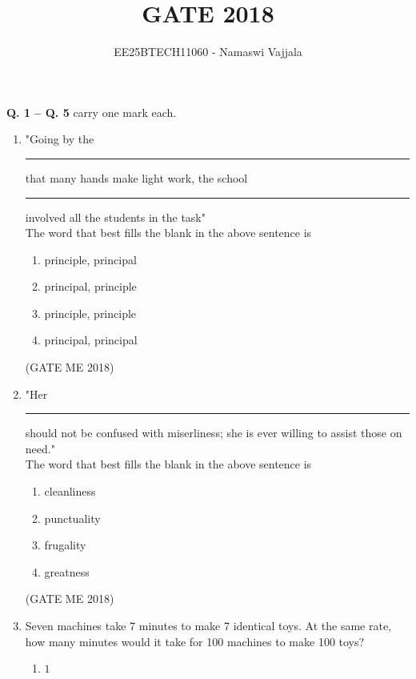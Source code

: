 \documentclass[journal]{IEEEtran}
\numberwithin{equation}{enumi}
\numberwithin{figure}{enumi}
\begin{document}

\vspace{3cm}

\title{GATE 2018}
\author{EE25BTECH11060 - Namaswi Vajjala}
\maketitle

\noindent \textbf{Q. 1 -- Q. \textbf{5}} carry one mark each.

\begin{enumerate}
    \item "Going by the\rule{3cm}{0.15mm} that many hands make light work, the school\rule{3cm}{0.15mm} involved all the students in the task"\\The word that best fills the blank in the above sentence is
    \begin{multicols}{2}
    \begin{enumerate}
        \item  principle, principal
        \item  principal, principle\\
        \item  principle, principle
        \item  principal, principal
    \end{enumerate}
    \end{multicols}
     \hfill{(GATE ME 2018)}
    \bigskip
    \item "Her\rule{3cm}{0.15mm} should not be confused with miserliness; she is ever willing to assist those on need."\\The word that best fills the blank in the above sentence is
\begin{multicols}{4}
\begin{enumerate}
    \item cleanliness
    \item punctuality
    \item frugality
    \item greatness
\end{enumerate}
\end{multicols}
 \hfill{(GATE ME 2018)}
\bigskip
\item Seven machines take 7 minutes to make 7 identical toys. At the same rate, how many minutes would it take for 100 machines to make 100 toys?
\begin{multicols}{4}
\begin{enumerate}
    \item $1$

\end{enumerate}
\end{multicols}
\end{enumerate}
\end{document}
